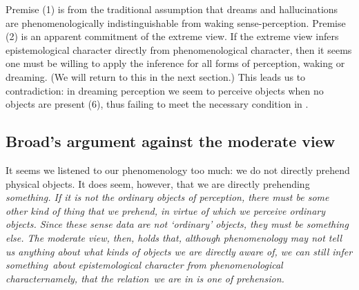 Premise (1) is from the traditional assumption that dreams and hallucinations are phenomenologically indistinguishable from waking sense-perception. Premise (2) is an apparent commitment of the extreme view. If the extreme view infers epistemological character directly from phenomenological character, then it seems one must be willing to apply the inference for all forms of perception, waking or dreaming. (We will return to this in the next section.) This leads us to contradiction: in dreaming perception we seem to perceive objects when no objects are present (6), thus failing to meet the necessary condition in \PRO.

\subsection{Broad's argument against the moderate view}\label{moderate}

It seems we listened to our phenomenology too much: we do not directly prehend physical objects. It does seem, however, that we are directly prehending \em something\em. If it is not the ordinary objects of perception, there must be some other kind of thing that we prehend, in virtue of which we perceive ordinary objects. Since these sense data are not `ordinary' objects, they must be something else. The moderate view, then, holds that, although phenomenology may not tell us anything about what \emph{kinds} of objects we are directly aware of, we can still infer \em something\em\ about epistemological character from phenomenological character\textemdash namely, that the \em relation\em\ we are in is one of prehension. 

